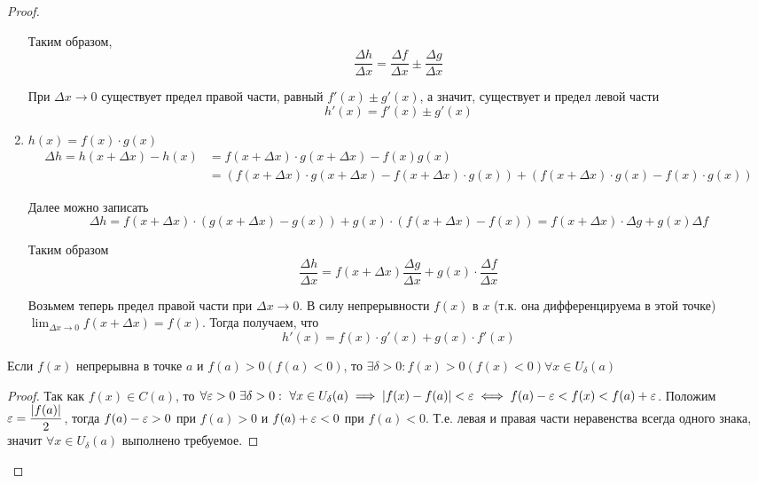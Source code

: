 \documentclass[a4paper]{article}
\theoremstyle{named}
\begin{document}
\begin{colloq}
\begin{proof}
\begin{enumerate}
				Таким образом,
				\begin{equation*}
					\dfrac{\Delta h}{\Delta x} = \dfrac{\Delta f}{\Delta x} \pm \dfrac{\Delta g}{\Delta x}
				\end{equation*}

				При $\Delta x \to 0$ существует предел правой части, равный $f'(x) \pm g'(x)$, а значит, существует и предел левой части
				\begin{equation*}
					h'(x) = f'(x) \pm g'(x)
				\end{equation*}


				\item
				$h(x) = f(x) \cdot g(x)$
				\begin{align*}
					\Delta h 
					= h(x + \Delta x) - h(x)
					&= f(x + \Delta x) \cdot g(x + \Delta x) - f(x)g(x) \\
					&=(f(x + \Delta x) \cdot g(x + \Delta x) - f(x + \Delta x) \cdot g(x)) + (f(x + \Delta x) \cdot g(x) - f(x) \cdot g(x))
				\end{align*}

				Далее можно записать
				\begin{equation*}
					\Delta h = f(x + \Delta x) \cdot (g(x + \Delta x) - g(x)) + g(x) \cdot (f(x + \Delta x) - f(x)) = f(x + \Delta x) \cdot \Delta g + g(x) \Delta f
				\end{equation*}

				Таким образом
				\begin{equation*}
					\dfrac{\Delta h}{\Delta x} = f(x + \Delta x) \dfrac{\Delta g}{\Delta x} + g(x) \cdot \dfrac{\Delta f}{\Delta x}
				\end{equation*}

				Возьмем теперь предел правой части при $\Delta x \to 0$. В силу непрерывности $f(x)$ в $x$ (т.к. она дифференцируема в этой точке) $\lim_{\Delta x \to 0} f(x + \Delta x) = f(x)$. Тогда получаем, что
				\begin{equation*}
					h'(x) = f(x) \cdot g'(x) + g(x) \cdot f'(x)
				\end{equation*}
			\end{enumerate}

			\begin{lemma}
				Если $f(x)$ непрерывна в точке $a$ и $f(a) > 0 (f(a) < 0)$, то $\exists \delta > 0: f(x) > 0 (f(x) < 0) \forall x \in U_{\delta}(a)$
			\end{lemma}

			\begin{proof}
				Так как $f(x) \in C(a)$, то $\forall \varepsilon > 0 \ \exists \delta > 0: \ \forall x \in U_{\delta}(a) \implies |f(x) - f(a)| < \varepsilon \iff f(a) - \varepsilon < f(x) < f(a) + \varepsilon$. Положим $\varepsilon = \dfrac{|f(a)|}{2}$, тогда $f(a) - \varepsilon > 0$ при $f(a) > 0$ и $f(a) + \varepsilon < 0$ при $f(a) < 0$. Т.е. левая и правая части неравенства всегда одного знака, значит $\forall x \in U_{\delta}(a)$ выполнено требуемое.
			\end{proof}


\end{proof}
\end{colloq}
\end{document}
